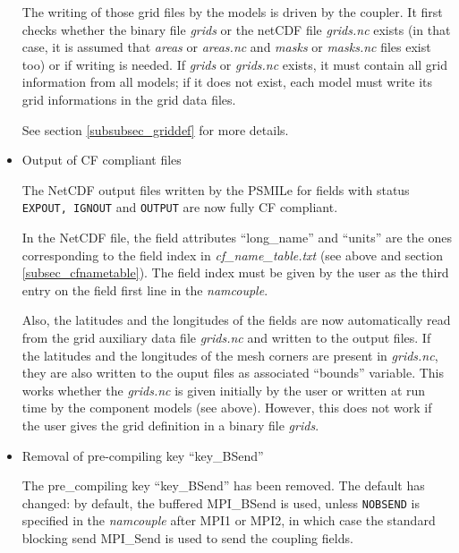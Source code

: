 \begin{itemize}
The writing of those grid files by the models is driven by the
coupler. It first checks whether the binary file {\em grids} or the
netCDF file {\em grids.nc} exists (in that case, it is assumed that
{\em areas} or {\em areas.nc} and {\em masks} or {\em masks.nc} files
exist too) or if writing is needed. If {\em grids} or {\em grids.nc}
exists, it must contain all grid information from all models; if it does not
exist, each model must write its grid informations in the grid data
files. 

See section \ref{subsubsec_griddef} for more details.

\item Output of CF compliant files

The NetCDF output files written by the PSMILe for fields with status
{\tt EXPOUT, IGNOUT} and {\tt OUTPUT} are now fully CF compliant.

In the NetCDF file, the field attributes ``long\_name'' and ``units''
are the ones corresponding to the field index in {\em
cf\_name\_table.txt} (see above and section
\ref{subsec_cfnametable}). The field index must be given by the user
as the third entry on the field first line in the {\it namcouple}.

Also, the latitudes and the longitudes of the fields are now
automatically read from the grid auxiliary data file {\em grids.nc} and
written to the output files. If the latitudes and the longitudes of
the mesh corners are present in {\em grids.nc}, they are also written to the
ouput files as associated ``bounds'' variable.  This works whether the
{\em grids.nc} is given initially by the user or written at run time by the
component models (see above). However, this does not work if the
user gives the grid definition in a binary file {\em grids}.

\item Removal of pre-compiling key ``key\_BSend''


The pre\_compiling key ``key\_BSend'' has been removed.  The default has
changed: by default, the buffered MPI\_BSend is used, unless {\tt NOBSEND}
is specified in the {\it namcouple} after MPI1 or MPI2, in which case the
standard blocking send MPI\_Send is used to send the coupling fields.

\end{itemize}



